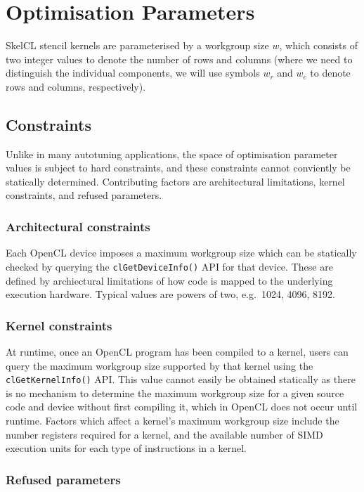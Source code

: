 \section{Optimisation Parameters}\label{sec:op-params}

SkelCL stencil kernels are parameterised by a workgroup size $w$,
which consists of two integer values to denote the number of rows and
columns (where we need to distinguish the individual components, we
will use symbols $w_r$ and $w_c$ to denote rows and columns,
respectively).


\subsection{Constraints}

Unlike in many autotuning applications, the space of optimisation
parameter values is subject to hard constraints, and these constraints
cannot conviently be statically determined. Contributing factors are
architectural limitations, kernel constraints, and refused parameters.


\subsubsection{Architectural constraints}

Each OpenCL device imposes a maximum workgroup size which can be
statically checked by querying the \texttt{clGetDeviceInfo()} API for
that device. These are defined by archiectural limitations of how code
is mapped to the underlying execution hardware. Typical values are
powers of two, e.g.\ 1024, 4096, 8192.


\subsubsection{Kernel constraints}

At runtime, once an OpenCL program has been compiled to a kernel,
users can query the maximum workgroup size supported by that kernel
using the \texttt{clGetKernelInfo()} API. This value cannot easily be
obtained statically as there is no mechanism to determine the maximum
workgroup size for a given source code and device without first
compiling it, which in OpenCL does not occur until runtime. Factors
which affect a kernel's maximum workgroup size include the number
registers required for a kernel, and the available number of SIMD
execution units for each type of instructions in a kernel.


\subsubsection{Refused parameters}

